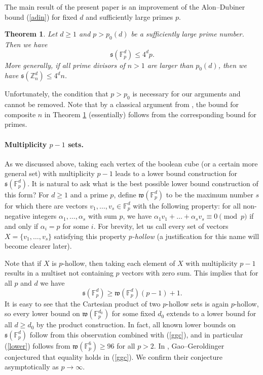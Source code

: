 \documentclass{daj}
\renewcommand{\le}{\leqslant}
\renewcommand{\ge}{\geqslant}
\newcommand{\s}{\mathfrak s}
\newcommand{\w}{\mathfrak w}
\newcommand{\Z}{\mathbb Z}
\newcommand{\FF}{\mathbb F}
\newtheorem{theorem}{Theorem}[section]
\theoremstyle{definition}
\theoremstyle{remark}
\theoremstyle{definition}
\theoremstyle{definition}
\begin{document}
The main result of the present paper is an improvement of the Alon--Dubiner bound (\ref{adin}) for fixed $d$ and sufficiently large primes $p$.

\begin{theorem}\label{thcr}
Let $d \ge 1$ and $p > p_0(d)$ be a sufficiently large prime number. Then we have 
\begin{equation}\label{crude}
    \s(\FF_p^d) \le 4^d p.
\end{equation}
More generally, if all prime divisors of $n > 1$ are larger than $p_0(d)$, then we have $\s(\Z_n^d) \le 4^d n$. 
\end{theorem}

Unfortunately, the condition that $p > p_0$  is necessary for our arguments and cannot be removed. Note that by a classical argument from \cite{EGZ}, the bound for composite $n$ in Theorem \ref{thcr} (essentially) follows from the corresponding bound for primes.

\paragraph{Multiplicity $p-1$ sets.}
As we discussed above, taking each vertex of the boolean cube (or a certain more general set) with multiplicity $p-1$ leads to a lower bound construction for $\s(\FF_p^d)$. It is natural to ask what is the best possible lower bound construction of this form?
For $d \ge 1$ and a prime $p$, define $\w(\FF_p^d)$ to be the maximum number $s$ for which there are vectors $v_1, \ldots, v_s \in \FF_p^d$ with the following property: for all non-negative integers $\alpha_1, \ldots, \alpha_s$ with sum $p$, we have $\alpha_1 v_1 + \ldots + \alpha_s v_s \equiv 0 \pmod p$ if and only if $\alpha_i = p$ for some $i$. For brevity, let us call every set of vectors $X = \{v_1, \ldots, v_s\}$ satisfying this property {\em $p$-hollow} (a justification for this name will become clearer later).

Note that if $X$ is $p$-hollow, then taking each element of $X$ with multiplicity $p-1$ results in a multiset not containing $p$ vectors with zero sum. This implies that for all $p$ and $d$ we have
\begin{equation}\label{ggc}
    \s(\FF_p^d) \ge \w(\FF_p^d)(p-1)+1.
\end{equation}
It is easy to see that the Cartesian product of two $p$-hollow sets is again $p$-hollow, so every lower bound on $\w(\FF_p^{d_0})$ for some fixed $d_0$ extends to a lower bound for all $d \ge d_0$ by the product construction. In fact, all known lower bounds on $\s(\FF_p^d)$ follow from this observation combined with (\ref{ggc}), and in particular (\ref{lower}) follows from $\w(\FF_p^6) \ge 96$ for all $p > 2$.
In \cite{GG}, Gao--Geroldinger conjectured that equality holds in (\ref{ggc}). We confirm their conjecture asymptotically as $p \rightarrow \infty$. 
\end{document}
